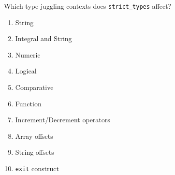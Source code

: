 \documentclass[aspectratio=169]{beamer}
\begin{document}
\begin{frame}{Which type juggling contexts does \texttt{strict\_types} affect?}
    \begin{enumerate}
        \item String
        \item Integral and String
        \item Numeric
        \item Logical
        \item Comparative
        \item \alert<2>{Function}
        \item Increment/Decrement operators
        \item Array offsets
        \item String offsets
        \item \texttt{exit} construct
    \end{enumerate}
\end{frame}
\end{document}
